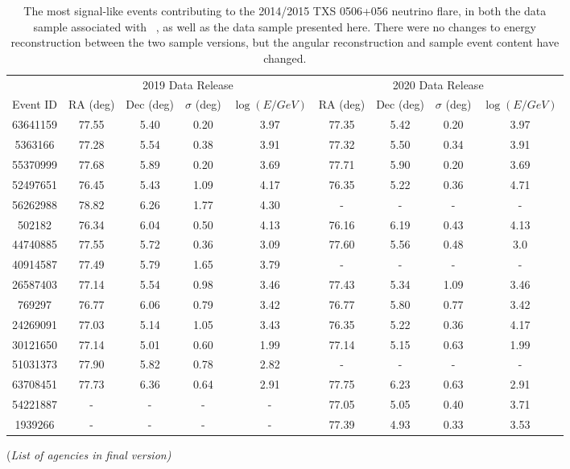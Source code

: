 \documentclass[aps,10pt,prd,twocolumn,floats,letterpaper,showpacs,nofootinbib,bibnotes,notitlepage,superscriptaddress,floatfix]{revtex4-1}
\newcommand{\MA}[1]{{\color{magenta}#1}}
\begin{document}
\begin{table}
\centering
\begin{ruledtabular}
\begin{tabular}{c|cccc|cccc}
\multicolumn{1}{c|}{} &
\multicolumn{4}{c|}{2019 Data Release} & 
\multicolumn{4}{c}{2020 Data Release}\\[0.1cm]
Event ID & RA (deg) & Dec (deg) & $\sigma$ (deg) & $\log(E/GeV)$ & RA (deg) & Dec (deg) & $\sigma$ (deg) & $\log(E/GeV)$\\ 
\hline
63641159 & 77.55 & 5.40 & 0.20 & 3.97 & 77.35 & 5.42 & 0.20 & 3.97\\
5363166 & 77.28 & 5.54 & 0.38 & 3.91 & 77.32 & 5.50 & 0.34 & 3.91\\
55370999 & 77.68 & 5.89 & 0.20 & 3.69 & 77.71 & 5.90 & 0.20 & 3.69\\
52497651 & 76.45 & 5.43 & 1.09 & 4.17 & 76.35 & 5.22 & 0.36 & 4.71\\
56262988 & 78.82 & 6.26 & 1.77 & 4.30 & - & - & - & - \\
502182 & 76.34 & 6.04 & 0.50 & 4.13 & 76.16 & 6.19 & 0.43 & 4.13 \\
44740885 & 77.55 & 5.72 & 0.36 & 3.09 & 77.60 & 5.56 & 0.48 & 3.0 \\
40914587 & 77.49 & 5.79 & 1.65 & 3.79 & - & - & - & -  \\
26587403 & 77.14 & 5.54 & 0.98 & 3.46 & 77.43 & 5.34 & 1.09 & 3.46 \\
769297 & 76.77 & 6.06 & 0.79 & 3.42 & 76.77 & 5.80 & 0.77 & 3.42 \\
24269091 & 77.03 & 5.14 & 1.05 & 3.43 & 76.35 & 5.22 & 0.36 & 4.17 \\
30121650 & 77.14 & 5.01 & 0.60 & 1.99 & 77.14 & 5.15 & 0.63 & 1.99 \\
51031373 & 77.90 & 5.82 & 0.78 & 2.82 & - & - & - & - \\
63708451 & 77.73 & 6.36 & 0.64 & 2.91 & 77.75 & 6.23 & 0.63 & 2.91 \\
54221887 & - & - & - & - & 77.05 & 5.05 & 0.40 & 3.71 \\
1939266 & - & - & - & - & 77.39 & 4.93 & 0.33 & 3.53 \\
\end{tabular}
\end{ruledtabular}
\caption[]{The most signal-like events contributing to the 2014/2015 TXS 0506+056 neutrino flare, in both the data sample associated with ~\cite{IceCube:2019}, as well as the data sample presented here. There were no changes to energy reconstruction between the two sample versions, but the angular reconstruction and sample event content have changed.}\label{tab:TXSFlareEvtsTable}
\end{table}

\begin{acknowledgements}
\begin{center}\MA{(\it List of agencies in final version)}\end{center}
%
\end{acknowledgements}




\end{document}
